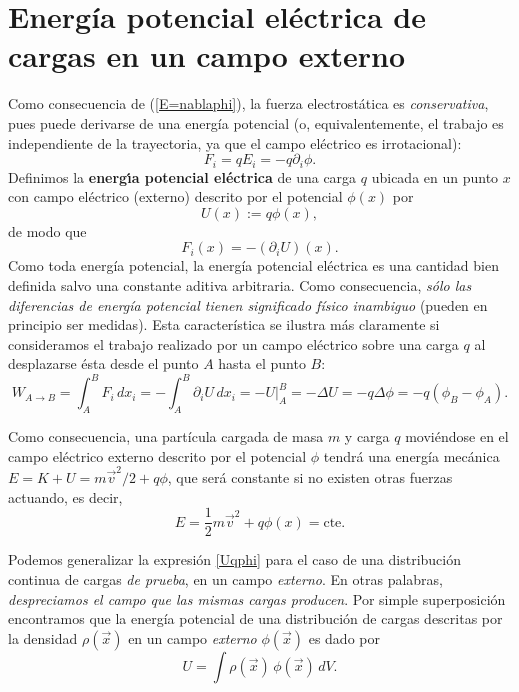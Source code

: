 \section{Energía potencial eléctrica de cargas en un campo externo}
Como consecuencia de (\ref{E=nablaphi}), la fuerza electrostática es
\textit{conservativa}, pues puede derivarse de una energía potencial (o,
equivalentemente, el trabajo es independiente de la trayectoria, ya que el campo
eléctrico es irrotacional):
\begin{equation}
\boxed{F_i=qE_i=-q\partial_i\phi .}
\end{equation}
Definimos la \textbf{energ\'{\i}a potencial eléctrica} de una carga $q$ ubicada en un punto $x$ con campo eléctrico (externo) descrito por el potencial $\phi(x)$ por
\begin{equation}
\boxed{U(x):=q\phi(x),} \label{Uqphi}
\end{equation}
de modo
que
\begin{equation}
\boxed{F_i(x)=-(\partial_iU)(x) .}
\end{equation}
Como toda energía potencial, la energía potencial eléctrica es una
cantidad bien definida salvo una constante aditiva arbitraria. Como
consecuencia, \textit{sólo las diferencias de energía potencial tienen
significado físico inambiguo} (pueden en principio ser medidas). Esta característica se
ilustra más claramente si consideramos el trabajo realizado por un campo
eléctrico sobre una carga $q$ al desplazarse ésta desde el punto $A$ hasta el
punto $B$:
\begin{equation}\label{WABDU}
W_{A\rightarrow B}=\int_A^B F_i\, dx_i=-\int_A^B
\partial_iU\,dx_i=-\left.U\right|_A^B=-\Delta U=-q\Delta\phi=-q(\phi_B-\phi_A).
\end{equation}

Como consecuencia, una partícula cargada de masa $m$ y carga $q$ moviéndose en el campo eléctrico externo descrito por el potencial $\phi$ tendrá una energía mecánica $E=K+U=m\vec{v}^2/2+q\phi$, que será constante si no existen otras fuerzas actuando, es decir,
\begin{equation}
E=\frac{1}{2}m\vec{v}^2+q\phi(x)=\text{cte.}
\end{equation}

Podemos generalizar la expresión \eqref{Uqphi} para el caso de una distribución continua de cargas \textit{de prueba}, en un campo \textit{externo}. En otras palabras, \textit{despreciamos el campo que las mismas cargas producen}. Por simple superposición encontramos que la energía potencial de una distribución de cargas descritas por la densidad $\rho(\vec{x})$ en un campo \textit{externo} $\phi(\vec{x})$ es dado por
\begin{equation} \label{Urhophiext}
U=\int \rho(\vec{x})\,\phi(\vec{x})\,dV.
\end{equation}

